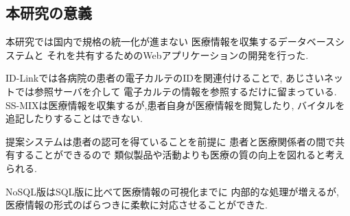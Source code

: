 \subsection{本研究の意義}
  本研究では国内で規格の統一化が進まない
  医療情報を収集するデータベースシステムと
  それを共有するためのWebアプリケーションの開発を行った.


  ID-Linkでは各病院の患者の電子カルテのIDを関連付けることで,
  あじさいネットでは参照サーバを介して
  電子カルテの情報を参照するだけに留まっている.
  SS-MIXは医療情報を収集するが,患者自身が医療情報を閲覧したり,
  バイタルを追記したりすることはできない.

  提案システムは患者の認可を得ていることを前提に
  患者と医療関係者の間で共有することができるので
  類似製品や活動よりも医療の質の向上を図れると考えられる.

  NoSQL版はSQL版に比べて医療情報の可視化までに
  内部的な処理が増えるが,
  医療情報の形式のばらつきに柔軟に対応させることができた.


